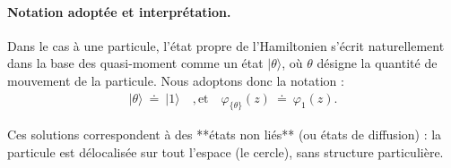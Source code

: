 \paragraph{Notation adoptée et interprétation.}

Dans le cas à une particule, l’état propre de l’Hamiltonien s’écrit naturellement dans la base des quasi-moment comme un état \(\vert \theta \rangle\), où \(\theta\) désigne la quantité de mouvement de la particule.  
Nous adoptons donc la notation :
\begin{eqnarray}
	\vert \theta \rangle ~ \doteq ~  \vert 1 \rangle \quad, \mbox{et} \quad  \varphi_{\{\theta\}}(z) ~ \doteq ~ \varphi_1(z).
\end{eqnarray}

Ces solutions correspondent à des **états non liés** (ou états de diffusion) : la particule est délocalisée sur tout l’espace (le cercle), sans structure particulière.





